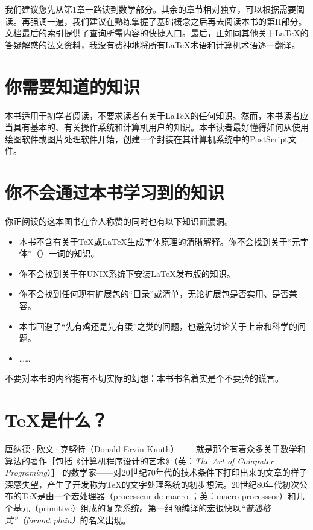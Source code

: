 我们建议您先从第1章一路读到数学部分。其余的章节相对独立，可以根据需要阅读。再强调一遍，我们建议在熟练掌握了基础概念之后再去阅读本书的第II部分。文档最后的索引提供了查询所需内容的快捷入口。最后，正如同其他关于\LaTeX 的答疑解惑的法文资料，我没有费神地将所有\LaTeX 术语和计算机术语逐一翻译。

\section*{你需要知道的知识}

本书适用于初学者阅读，不要求读者有关于\LaTeX 的任何知识。然而，本书读者应当具有基本的、有关操作系统和计算机用户的知识。本书读者最好懂得如何从使用绘图软件或图片处理软件开始，创建一个封装在其计算机系统中的PostScript文件。

\section*{你不会通过本书学习到的知识}

你正阅读的这本图书在令人称赞的同时也有以下知识面漏洞。

\begin{itemize}
    \item 本书不含有关于\TeX 或\LaTeX 生成字体原理的清晰解释。你不会找到关于“元字体”\linebreak （\MF）一词的知识。
    \item 你不会找到关于在UNIX系统下安装\LaTeX 发布版的知识。
    \item 你不会找到任何现有扩展包的“目录”或清单，无论扩展包是否实用、是否兼容。
    \item 本书回避了“先有鸡还是先有蛋”之类的问题，也避免讨论关于上帝和科学的问题。
    \item ……
\end{itemize}

\begin{exclamation}
不要对本书的内容抱有不切实际的幻想：本书书名着实是个不要脸的谎言。\\
\end{exclamation}

\section*{\TeX 是什么？}

唐纳德·欧文·克努特（Donald Ervin Knuth）——就是那个有着众多关于数学和算法的著作［包括《计算机程序设计的艺术》（英：\emph{The Art of Computer Programing}）］%
的数学家——对20世纪70年代的技术条件下打印出来的文章的样子深感失望，产生了开发称为\TeX 的文字处理系统的初步想法。20世纪80年代初次公布的\TeX 是由一个宏处理器（processeur de macro ；英：macro processsor）和几个基元（primitive）组成的复杂系统。第一组预编译的宏很快以\emph{“普通格式”（format plain）}的名义出现。


